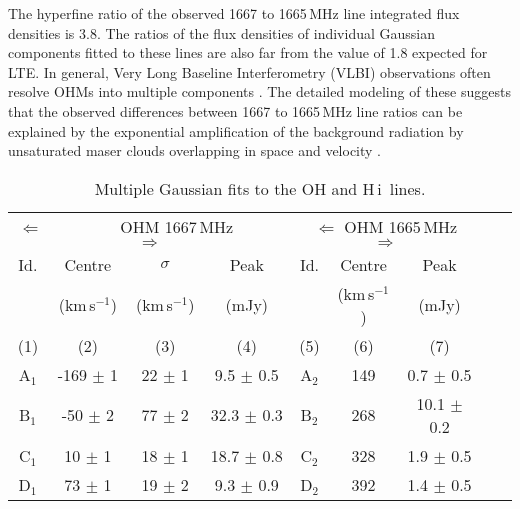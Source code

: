 \documentclass[iop,apjl,numberedappendix,appendixfloats,twocolappendix,revtex4]{emulateapj}
\newcommand{\hi}{\mbox{H\,{\sc i}}}
\newcommand{\kms}{km\,s$^{-1}$}
\begin{document}
The hyperfine ratio of the observed 1667 to 1665\,MHz line integrated flux densities is 3.8.  The ratios of the flux densities of individual Gaussian 
components fitted to these lines are also far from the value of 1.8 expected for LTE. 
In general, Very Long Baseline Interferometry (VLBI) observations often resolve OHMs into multiple components 
\citep[e.g.][]{Momjian06}. 
The detailed modeling of these suggests that the observed differences between 1667 to 1665\,MHz line ratios can be explained by the 
exponential amplification of the background radiation by unsaturated maser clouds overlapping in space and velocity 
\citep[e.g.][]{Parra05, Lockett08, Willett11}.

\begin{table}
\caption{Multiple Gaussian fits to the OH and \hi\ lines.}
\vspace{-0.4cm}
\begin{center}
\begin{tabular}{ccccccccc}
\hline
  \multicolumn{4}{c}{$\Longleftarrow$ ~~~~~~~~~OHM 1667\,MHz~~~~~~ $\Longrightarrow$}   &                     
  \multicolumn{3}{c}{$\Longleftarrow$  OHM 1665\,MHz  $\Longrightarrow$}                        \\
{\large \strut}     Id.    &    Centre     &  $\sigma$            &   Peak         &   Id.                &    Centre   &   Peak      \\
                           &   (\kms)      &   (\kms)             &   (mJy)        &                      &    (\kms)   &  (mJy)      \\
                  (1)      &   (2)         &    (3)               &   (4)          &   (5)                &    (6)      &   (7)       \\
\hline
                A$_1$      & -169 $\pm$ 1    & 22 $\pm$ 1   & 9.5 $\pm$ 0.5   &  A$_2$   &  149  & 0.7 $\pm$ 0.5          \\
                B$_1$      &  -50 $\pm$ 2    & 77 $\pm$ 2   &32.3 $\pm$ 0.3   &  B$_2$   &  268  &10.1 $\pm$ 0.2         \\
                C$_1$      &   10 $\pm$ 1    & 18 $\pm$ 1   &18.7 $\pm$ 0.8   &  C$_2$   &  328  & 1.9 $\pm$ 0.5         \\
                D$_1$      &   73 $\pm$ 1    & 19 $\pm$ 2   & 9.3 $\pm$ 0.9   &  D$_2$   &  392  & 1.4 $\pm$ 0.5         \\
\hline


\end{tabular}
\end{center}
\end{table}
\end{document}
